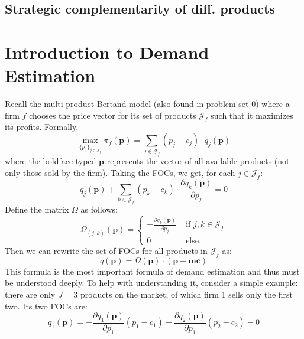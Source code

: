 \documentclass[12pt]{report}
\begin{document}
\section{Strategic complementarity of diff. products}



\chapter{Introduction to Demand Estimation}

Recall the multi-product Bertand model (also found in problem set 0) where a firm $f$ chooses the price vector for its set of products $\mathcal{J}_f$ such that it maximizes its profits. Formally, $$\max_{\{p_j\}_{j\in \mathcal{J}_f}} \pi_f(\mathbf{p}) = \sum_{j\in\mathcal{J}_f} (p_j - c_j)\cdot q_j(\mathbf{p}) $$ where the boldface typed $\mathbf{p}$ represents the vector of all available products (not only those sold by the firm). Taking the FOCs, we get, for each $j\in\mathcal{J}_f$: $$ q_j(\mathbf{p}) + \sum_{k\in\mathcal{J}_f} (p_k - c_k)\cdot \frac{\partial q_k(\mathbf{p})}{\partial p_j} = 0 $$ Define the matrix $\Omega$ as follows: $$\Omega_{(j, k)}(\mathbf{p}) = \begin{cases}
-\frac{\partial q_k(\mathbf{p})}{\partial p_j} & \text{ if } j, k \in \mathcal{J}_f \\
0 & \text{ else.}
\end{cases} $$ Then we can rewrite the set of FOCs for all products in $\mathcal{J}_f$ as: $$ q(\mathbf{p}) = \Omega(\mathbf{p})\cdot(\mathbf{p} - \mathbf{mc}) $$ This formula is the most important formula of demand estimation and thus must be understood deeply. To help with understanding it, consider a simple example: there are only $J = 3$ products on the market, of which firm 1 sells only the first two. Its two FOCs are: $$q_1(\mathbf{p}) = -\frac{\partial q_1(\mathbf{p})}{\partial p_1} (p_1 - c_1) - \frac{\partial q_2(\mathbf{p})}{\partial p_1} (p_2 - c_2) - 0 $$
\end{document}
